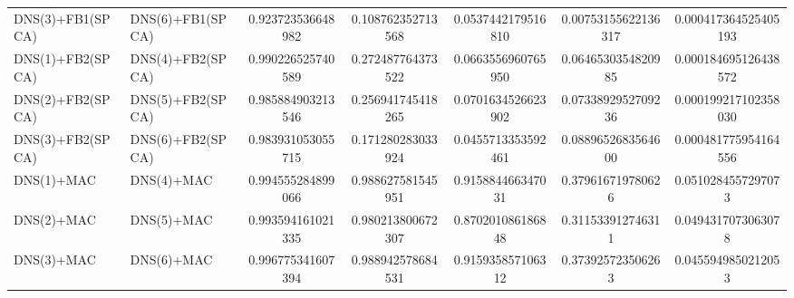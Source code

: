 \begin{table}[H]
\begin{tabular}{llSSSSS}
DNS(3)+FB1(SPCA) & DNS(6)+FB1(SPCA) & 0.923723536648982 & 0.108762352713568 & 0.0537442179516810 & 0.00753155622136317 & 0.000417364525405193 \\ 
DNS(1)+FB2(SPCA) & DNS(4)+FB2(SPCA) & 0.990226525740589 & 0.272487764373522 & 0.0663556960765950 & 0.0646530354820985 & 0.000184695126438572 \\ 
DNS(2)+FB2(SPCA) & DNS(5)+FB2(SPCA) & 0.985884903213546 & 0.256941745418265 & 0.0701634526623902 & 0.0733892952709236 & 0.000199217102358030 \\ 
DNS(3)+FB2(SPCA) & DNS(6)+FB2(SPCA) & 0.983931053055715 & 0.171280283033924 & 0.0455713353592461 & 0.0889652683564600 & 0.000481775954164556 \\ 
DNS(1)+MAC & DNS(4)+MAC & 0.994555284899066 & 0.988627581545951 & 0.915884466347031 & 0.379616719780626 & 0.0510284557297073 \\ 
DNS(2)+MAC & DNS(5)+MAC & 0.993594161021335 & 0.980213800672307 & 0.870201086186848 & 0.311533912746311 & 0.0494317073063078 \\ 
DNS(3)+MAC & DNS(6)+MAC & 0.996775341607394 & 0.988942578684531 & 0.915935857106312 & 0.373925723506263 & 0.0455949850212053 \\ \bottomrule 
\end{tabular}
\end{table}



